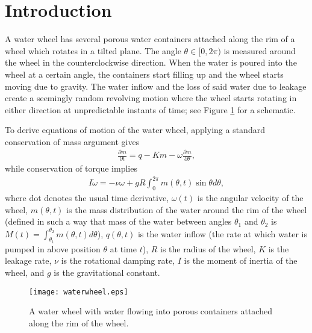 \section{Introduction} \label{sec:intro}
A water wheel has several porous water containers attached along the rim of a 
wheel which rotates in a tilted plane. The angle $\theta \in [0,2\pi)$ is measured around the 
wheel in the counterclockwise direction. When the water is poured into the wheel 
at a certain angle, the containers start filling up and the wheel starts moving 
due to gravity. The water inflow and the loss of said water due to leakage create a 
seemingly random revolving motion where the wheel starts rotating in either 
direction at unpredictable instants of time; see Figure \ref{fig:waterwheel} for a schematic. 

To derive equations of motion of the water wheel, applying a standard conservation of mass argument \cite{Strogatz14} gives
\begin{align} \label{eq:mc}
\frac{\partial m}{\partial t} =q -Km -\omega \frac{\partial m}{\partial \theta},
\end{align}
while conservation of torque implies
\begin{align} \label{eq:Tc}
I\dot{\omega} = -\nu \omega +gR \int_0^{2\pi} m(\theta ,t)\sin \theta d\theta,
\end{align}
where dot denotes the usual time derivative, $\omega(t)$ is the angular velocity of the wheel, $m(\theta, t)$ is the mass distribution of the water around the rim of the wheel (defined in such a way that mass of the water between angles $\theta_1$ and $\theta_2$ is $M(t) = \int_{\theta_1}^{\theta_2} m(\theta,t) d\theta$), $q(\theta,t)$ is the water inflow (the rate at which water is pumped in above position $\theta$ at time $t$), $R$ is the radius of the wheel, $K$ is the leakage rate, $\nu$ is the rotational damping rate, $I$ is the moment of inertia of the wheel, and $g$ is the gravitational constant.

\begin{figure}
\centering
\texttt{[image: waterwheel.eps]}
\caption{A water wheel with water flowing into porous containers attached along the rim of the wheel.}
 \label{fig:waterwheel}
\end{figure}


